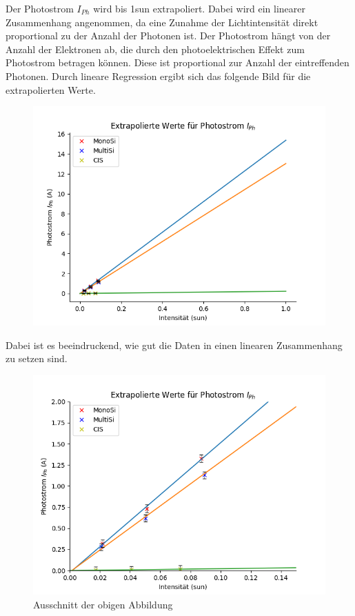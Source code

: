 Der Photostrom $I_{Ph}$ wird bis 1sun extrapoliert. Dabei wird ein linearer Zusammenhang angenommen, da eine Zunahme der Lichtintensität direkt proportional zu der 
Anzahl der Photonen ist. Der Photostrom hängt von der Anzahl der Elektronen ab, die durch den photoelektrischen Effekt zum Photostrom betragen können. Diese ist proportional zur 
Anzahl der eintreffenden Photonen. Durch lineare Regression ergibt sich das folgende Bild für die extrapolierten Werte.
\begin{figure}[ht]
    \centering
    \includegraphics[width = 12cm]{Bilder/ExtrapolierteIPh.png}
\end{figure} 

Dabei ist es beeindruckend, wie gut die Daten in einen linearen Zusammenhang zu setzen sind.


\begin{figure}[ht]
    \centering
    \includegraphics[width = 12cm]{Bilder/ExtrapolierteIPhAusschnitt.png}
    \caption{Ausschnitt der obigen Abbildung}
\end{figure} 
